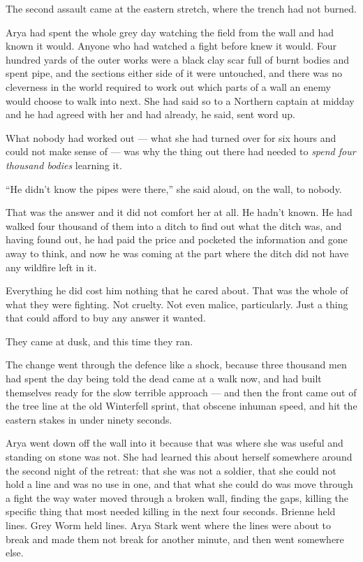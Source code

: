 The second assault came at the eastern stretch, where the trench had not burned.

Arya had spent the whole grey day watching the field from the wall and had known it would. Anyone who had watched a fight before knew it would. Four hundred yards of the outer works were a black clay scar full of burnt bodies and spent pipe, and the sections either side of it were untouched, and there was no cleverness in the world required to work out which parts of a wall an enemy would choose to walk into next. She had said so to a Northern captain at midday and he had agreed with her and had already, he said, sent word up.

What nobody had worked out — what she had turned over for six hours and could not make sense of — was why the thing out there had needed to \textit{spend four thousand bodies} learning it.

“He didn’t know the pipes were there,” she said aloud, on the wall, to nobody.

That was the answer and it did not comfort her at all. He hadn’t known. He had walked four thousand of them into a ditch to find out what the ditch was, and having found out, he had paid the price and pocketed the information and gone away to think, and now he was coming at the part where the ditch did not have any wildfire left in it.

Everything he did cost him nothing that he cared about. That was the whole of what they were fighting. Not cruelty. Not even malice, particularly. Just a thing that could afford to buy any answer it wanted.

\sceneBreak

They came at dusk, and this time they ran.

The change went through the defence like a shock, because three thousand men had spent the day being told the dead came at a walk now, and had built themselves ready for the slow terrible approach — and then the front came out of the tree line at the old Winterfell sprint, that obscene inhuman speed, and hit the eastern stakes in under ninety seconds.

Arya went down off the wall into it because that was where she was useful and standing on stone was not. She had learned this about herself somewhere around the second night of the retreat: that she was not a soldier, that she could not hold a line and was no use in one, and that what she could do was move through a fight the way water moved through a broken wall, finding the gaps, killing the specific thing that most needed killing in the next four seconds. Brienne held lines. Grey Worm held lines. Arya Stark went where the lines were about to break and made them not break for another minute, and then went somewhere else.

